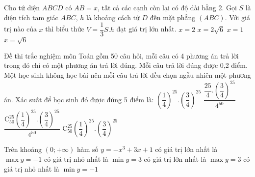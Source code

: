 \begin{ex}%
	Cho tứ diện $ABCD$ có $AB = x$, tất cả các cạnh còn lại có độ dài bằng 2. Gọi $S$ là diện tích tam giác $ABC$, $h$ là khoảng cách từ $D$ đến mặt phẳng $(ABC)$. Với giá trị nào của $x$ thì biểu thức $V=\dfrac{1}{3}S.h $ đạt giá trị lớn nhất.
	\choice
	{$ x = 2 $}
	{$ x = 2\sqrt 6 $}
	{$ x = 1 $}
	{\True $ x = \sqrt 6 $}
\end{ex}

\begin{ex}%
	Đề thi trắc nghiệm môn Toán gồm 50 câu hỏi, mỗi câu có 4 phương án trả lời trong đó chỉ có một phương án trả lời đúng. Mỗi câu trả lời đúng được 0,2 điểm. Một học sinh không học bài nên mỗi câu trả lời đều chọn ngẫu nhiên một phương án. Xác suất để học sinh đó được đúng 5 điểm là:
	\choice
	{$\left({\dfrac{1}{4}}\right)^{25}.\left({\dfrac{3}{4}}\right)^{25}$}
	{$\dfrac{\dfrac{25}{4}.\left(\dfrac{3}{4}\right)^{25}}{4^{50}}$}
	{$ \dfrac{{\mathrm{C}_{50}^{25}{\left(\dfrac{1}{4}\right)^{25}}.{\left(\dfrac{3}{4}\right)^{25}}}}{4^{50}}$}
	{\True $\mathrm{C}_{50}^{25}{\left({\dfrac{1}{4}}\right)^{25}}.{\left({\dfrac{3}{4}}\right)^{25}}$}
\end{ex}
\begin{ex}%
	Trên khoảng $ (0; + \infty)$ hàm số $ y =  -{x^3}+ 3x + 1 $
	\choice
	{có giá trị lớn nhất là $ \max y =  - 1 $}
	{có giá trị nhỏ nhất là $ \min y = 3 $}
	{\True có giá trị lớn nhất là $ \max y = 3 $}
	{có giá trị nhỏ nhất là $ \min y =  - 1 $}
\end{ex}


